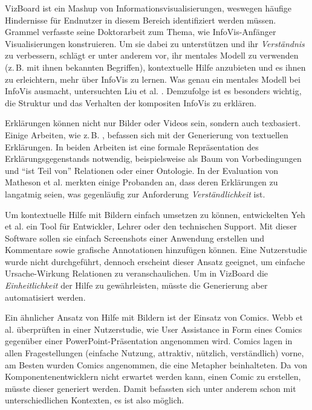 \documentclass[
	headsepline,
	footsepline,
	fontsize=12pt,
	bibliography=totoc
]{scrbook}
\begin{document}
VizBoard ist ein Mashup von Informationsvisualisierungen, weswegen häufige Hindernisse für Endnutzer in diesem Bereich identifiziert werden müssen. Grammel \cite{Grammel2012} verfasste seine Doktorarbeit zum Thema, wie InfoVis-Anfänger Visualisierungen konstruieren. Um sie dabei zu unterstützen und ihr \emph{Verständnis} zu verbessern, schlägt er unter anderem vor, ihr mentales Modell zu verwenden (z.\,B. mit ihnen bekannten Begriffen), kontextuelle Hilfe anzubieten und es ihnen zu erleichtern, mehr über InfoVis zu lernen. Was genau ein mentales Modell bei InfoVis ausmacht, untersuchten Liu et al. \cite{Liu2010}. Demzufolge ist es besonders wichtig, die Struktur und das Verhalten der kompositen InfoVis zu erklären.



Erklärungen können nicht nur Bilder oder Videos sein, sondern auch texbasiert. Einige Arbeiten, wie z.\,B. \cite{Gesell2012, Matheson2012}, befassen sich mit der Generierung von textuellen Erklärungen. In beiden Arbeiten ist eine formale Repräsentation des Erklärungsgegenstands notwendig, beispielsweise als Baum von Vorbedingungen und \enquote{ist Teil von} Relationen oder einer Ontologie. In der Evaluation von Matheson et al. merkten einige Probanden an, dass deren Erklärungen zu langatmig seien, was gegenläufig zur Anforderung \emph{Verständlichkeit} ist.


Um kontextuelle Hilfe mit Bildern einfach umsetzen zu können, entwickelten Yeh et al. \cite{Yeh2011} ein Tool für Entwickler, Lehrer oder den technischen Support. Mit dieser Software sollen sie einfach Screenshots einer Anwendung erstellen und Kommentare sowie grafische Annotationen hinzufügen können. Eine Nutzerstudie wurde nicht durchgeführt, dennoch erscheint dieser Ansatz geeignet, um einfache Ursache-Wirkung Relationen zu veranschaulichen. Um in VizBoard die \emph{Einheitlichkeit} der Hilfe zu gewährleisten, müsste die Generierung aber automatisiert werden.


Ein ähnlicher Ansatz von Hilfe mit Bildern ist der Einsatz von Comics. Webb et al. \cite{Webb2012} überprüften in einer Nutzerstudie, wie User Assistance in Form eines Comics gegenüber einer PowerPoint-Präsentation angenommen wird. Comics lagen in allen Fragestellungen (einfache Nutzung, attraktiv, nützlich, verständlich) vorne, am Besten wurden Comics angenommen, die eine Metapher beinhalteten. Da von Komponentenentwicklern nicht erwartet werden kann, einen Comic zu erstellen, müsste dieser generiert werden. Damit befassten sich unter anderem schon \cite{Kurlander1996, Shamir2006, Chan2009, Wen2012} mit unterschiedlichen Kontexten, es ist also möglich.
\end{document}
